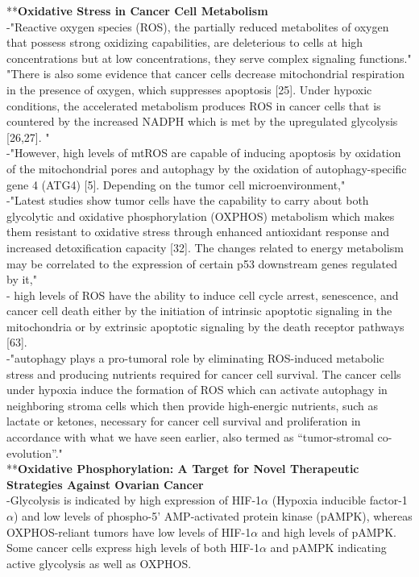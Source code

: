 \documentclass[11pt,a4paper]{article}
\begin{document}
**\textbf{Oxidative Stress in Cancer Cell Metabolism}\\

-"Reactive oxygen species (ROS), the partially reduced metabolites of oxygen that possess strong oxidizing capabilities, are deleterious to cells at high concentrations but at low concentrations, they serve complex signaling functions."\\

"There is also some evidence that cancer cells decrease mitochondrial respiration in the presence of oxygen, which suppresses apoptosis [25]. Under hypoxic conditions, the accelerated metabolism produces ROS in cancer cells that is countered by the increased NADPH which is met by the upregulated glycolysis [26,27]. "\\

-"However, high levels of mtROS are capable of inducing apoptosis by oxidation of the mitochondrial pores and autophagy by the oxidation of autophagy-specific gene 4 (ATG4) [5]. Depending on the tumor cell microenvironment,"\\

-"Latest studies show tumor cells have the capability to carry about both glycolytic and oxidative phosphorylation (OXPHOS) metabolism which makes them resistant to oxidative stress through enhanced antioxidant response and increased detoxification capacity [32]. The changes related to energy metabolism may be correlated to the expression of certain p53 downstream genes regulated by it,"\\

- high levels of ROS have the ability to induce cell cycle arrest, senescence, and cancer cell death either by the initiation of intrinsic apoptotic signaling in the mitochondria or by extrinsic apoptotic signaling by the death receptor pathways [63].\\

-"autophagy plays a pro-tumoral role by eliminating ROS-induced metabolic stress and producing nutrients required for cancer cell survival. The cancer cells under hypoxia induce the formation of ROS which can activate autophagy in neighboring stroma cells which then provide high-energic nutrients, such as lactate or ketones, necessary for cancer cell survival and proliferation in accordance with what we have seen earlier, also termed as “tumor-stromal co-evolution”."\\

**\textbf{Oxidative Phosphorylation: A Target for Novel Therapeutic Strategies Against Ovarian Cancer}\\

-Glycolysis is indicated by high expression of HIF-1$\alpha$ (Hypoxia inducible factor-1$\alpha$) and low levels of phospho-5’ AMP-activated protein kinase (pAMPK), whereas OXPHOS-reliant tumors have low levels of HIF-1$\alpha$ and high levels of pAMPK. Some cancer cells express high levels of both HIF-1$\alpha$ and pAMPK indicating active glycolysis as well as OXPHOS. 
\end{document}
